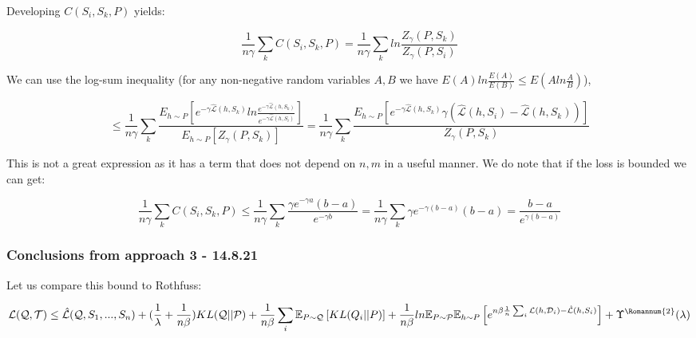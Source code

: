 \documentclass[letterpaper]{article}
\theoremstyle{definition}
\begin{document}
Developing $C(S_i,S_k,P)$ yields:

$$\frac{1}{n\gamma}\sum_k C(S_i,S_k,P) = \frac{1}{n\gamma}\sum_k ln\frac{Z_{\gamma}(P,S_k)}{ Z_{\gamma}(P,S_i)} $$

We can use the log-sum inequality (for any non-negative random variables $A,B$ we have $E(A)ln\frac{E(A)}{E(B)}\leq E(Aln\frac{A}{B})$), 

$$\leq  
\frac{1}{n\gamma}\sum_k \frac{E_{h\sim P}\left [e^{-\gamma\hat{\mathcal{L}}(h,S_k)}ln\frac{e^{-\gamma\hat{\mathcal{L}}(h,S_k)}}{e^{-\gamma\hat{\mathcal{L}}(h,S_i)}}  \right ]}{E_{h\sim P}\left [Z_{\gamma}(P,S_k)\right ]} = \frac{1}{n\gamma}\sum_k \frac{E_{h\sim P}\left [e^{-\gamma\hat{\mathcal{L}}(h,S_k)}\gamma (\hat{\mathcal{L}}(h,S_i)-\hat{\mathcal{L}}(h,S_k))  \right ]}{Z_{\gamma}(P,S_k)}$$


This is not a great expression as it has a term that does not depend on $n,m$ in a useful manner.
We do note that if the loss is bounded we can get:

$$\frac{1}{n\gamma}\sum_k C(S_i,S_k,P) \leq \frac{1}{n\gamma}\sum_k \frac{\gamma e^{-\gamma a}(b-a)}{ e^{-\gamma b}}=\frac{1}{n\gamma}\sum_k \gamma e^{-\gamma (b-a)}(b-a)=\frac{b-a}{e^{\gamma (b-a)}}$$



\subsubsection*{Conclusions from approach 3 - 14.8.21}

Let us compare this bound to Rothfuss:

$$\mathcal{L}(\mathcal{Q}, \mathcal{T}) \leq \hat{\mathcal{L}}(\mathcal{Q}, S_1,...,S_n) + (\frac{1}{\lambda}+\frac{1}{n\beta}) KL(\mathcal{Q}||\mathcal{P}) + \frac{1}{n\beta}\sum_i \mathbb{E}_{P\sim \mathcal{Q}} \left [KL(Q_i||P) \right ] + \frac{1}{n\beta}ln\mathbb{E}_{P\sim \mathcal{P}}\mathbb{E}_{h\sim P}\left [ e^{n\beta\frac{1}{n}\sum_i\mathcal{L}(h,\mathcal{D}_i)- \hat{\mathcal{L}}(h, S_i)} \right ] +\Upsilon^{\text{\Romannum{2}}}(\lambda)$$
\end{document}

